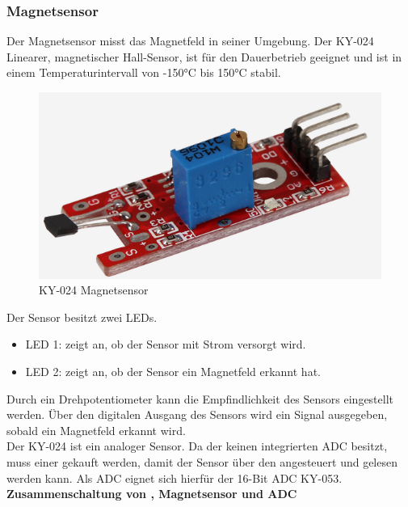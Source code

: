 \subsubsection{Magnetsensor}\label{sec: Magnetsensor}
Der Magnetsensor misst das Magnetfeld in seiner Umgebung. Der KY-024 Linearer, magnetischer Hall-Sensor\autocite{KY-024}, ist für den Dauerbetrieb geeignet und ist in einem Temperaturintervall von -150°C bis 150°C stabil. \\
\vspace{3mm}
\begin{figure}[H]
    \centering
    \includegraphics[scale=0.8]{image/magnetsensir.png}
    \caption{KY-024 Magnetsensor}
    \label{fig:enter-label}
\end{figure}
\vspace{3mm}
Der Sensor besitzt zwei LEDs. 
\begin{itemize}
    \item LED 1: zeigt an, ob der Sensor mit Strom versorgt wird.
    \item LED 2: zeigt an, ob der Sensor ein Magnetfeld erkannt hat.
\end{itemize}
\vspace{3mm}
Durch ein Drehpotentiometer kann die Empfindlichkeit des Sensors eingestellt werden. Über den digitalen Ausgang des Sensors wird ein Signal ausgegeben, sobald ein Magnetfeld erkannt wird.\\
\newpage
Der KY-024 ist ein analoger Sensor. Da der \raspi keinen integrierten ADC besitzt, muss einer gekauft werden, damit der Sensor über den \raspi angesteuert und gelesen werden kann. Als ADC eignet sich hierfür der 16-Bit ADC KY-053\autocite{KY-053}. \\
\vspace{2mm}
\textbf{Zusammenschaltung von \raspi, Magnetsensor und ADC}
